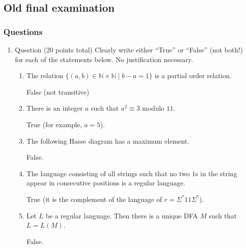 \documentclass{amsart}
\begin{document}
\subsection{Old final examination}
\label{sec:orgf237f97}
\toggletrue{solutions}
\subsubsection{Questions}
\label{sec:org8b48089}
\begin{enumerate}
\item Question (20 points total)
\label{sec:org0d5eb60}
Clearly write either ``True'' or ``False'' (not both!) for each of the statements below. No justification necessary.
\begin{enumerate}
\item The relation \(\{(a,b) \in \mathbb{N} \times \mathbb{N} \mid b - a = 1\}\) is a partial order relation.
\begin{solution}
False (not transitive)
\end{solution}

\item There is an integer \(a\) such that \(a^2 \equiv 3\) modulo \(11\).
\begin{solution}
True (for example, \(a = 5\)).
\end{solution}

\item The following Hasse diagram has a maximum element.
\begin{center}
\end{center}
\begin{solution}
False.
\end{solution}

\item The language consisting of all strings such that no two \(1\)s in the string appear in consecutive positions is a regular language.
\begin{solution}
True (it is the complement of the language of \(r = \Sigma^{*}11\Sigma^{*}\)).
\end{solution}

\item Let \(L\) be a regular language. Then there is a unique DFA \(M\) such that \(L = L(M)\).
\begin{solution}
False.
\end{solution}


\end{enumerate}
\end{enumerate}
\end{document}
